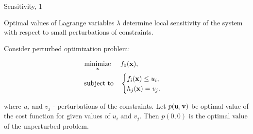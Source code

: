 \documentclass{beamer}
\begin{document}
\begin{frame}{Sensitivity, 1}
	\begin{flushleft}
		
		
		Optimal values of Lagrange variables $\lambda$ determine local sensitivity of the system with respect to small perturbations of constraints.
		
		\bigskip
		
		Consider perturbed optimization problem:
		
		\begin{equation}
			\begin{aligned}
				& \underset{\mathbf{x}}{\text{minimize}}
				& & f_0(\mathbf{x}), \\
				& \text{subject to}
				& & \begin{cases}
					f_i(\mathbf{x}) \leq u_i, \\
					h_j(\mathbf{x}) = v_j.
				\end{cases}
			\end{aligned}
		\end{equation}
		
		where $u_i$ and $v_j$ - perturbations of the constraints. Let $p(\mathbf{u}, \mathbf{v})$ be optimal value of the cost function for given values of $u_i$ and $v_j$. Then $p(0, 0)$ is the optimal value of the unperturbed problem.
		
		
	\end{flushleft}
\end{frame}



%		
%		
%		
%		
%		
%		
%		
%		
\end{document}
